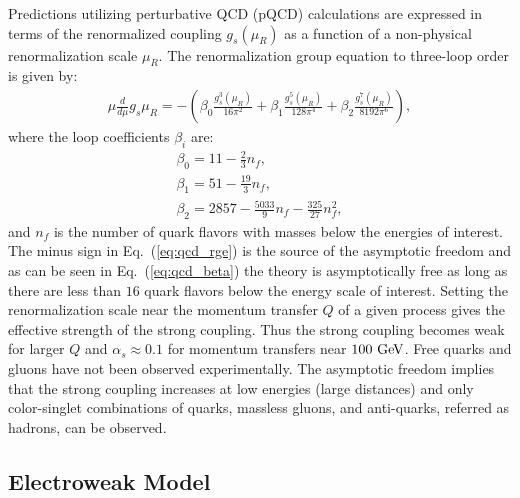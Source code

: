 Predictions utilizing perturbative QCD (pQCD) calculations are expressed in terms of the renormalized coupling $g_{s} (\mu_R)$ as a function of a non-physical renormalization scale $\mu_R$. The renormalization group equation to three-loop order is given by:
\begin{eqnarray} \label{eq:qcd_rge}
\mu\frac{d}{d\mu}g_s{\mu_R} = - (\beta_{0} \frac{g_{s}^{3}(\mu_R)}{16\pi^2} +  \beta_{1} \frac{g_{s}^{5}(\mu_R)}{128\pi^4} + \beta_{2} \frac{g_{s}^{7}(\mu_R)}{8192\pi^6}),
\end{eqnarray}
where the loop coefficients $\beta_{i}$ are:
\begin{eqnarray} \label{eq:qcd_beta}
\beta_{0}=11-\frac{2}{3}n_{f}, \\
\beta_{1}=51-\frac{19}{3}n_{f}, \\
\beta_{2}=2857-\frac{5033}{9}n_{f}-\frac{325}{27}n_{f}^2,
\end{eqnarray}
and $n_{f}$ is the number of quark flavors with masses below the energies of interest. The minus sign in Eq.~(\ref{eq:qcd_rge}) is the source of the asymptotic freedom and as can be seen in Eq.~(\ref{eq:qcd_beta}) the theory is asymptotically free as long as there are less than $16$ quark flavors below the energy scale of interest. Setting the renormalization scale near the momentum transfer $Q$ of a given process gives the effective strength of the strong coupling. Thus the strong coupling becomes weak for larger $Q$ and $\alpha_{s} \approx 0.1$ for momentum transfers near $100~\mathrm{Ge\kern -0.1em V}$. Free quarks and gluons have not been observed experimentally. The asymptotic freedom implies that the strong coupling increases at low energies (large distances) and only color-singlet combinations of quarks, massless gluons, and anti-quarks, referred as hadrons, can be observed.  
 
\subsection{Electroweak Model}


